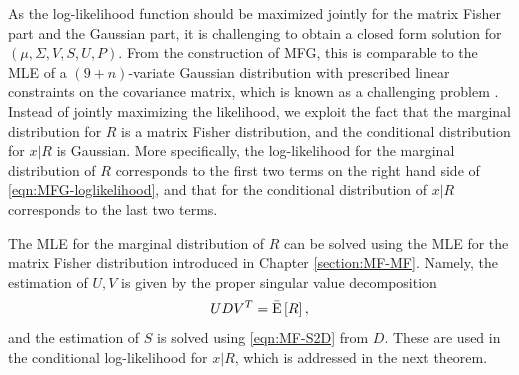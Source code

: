 As the log-likelihood function should be maximized jointly for the matrix Fisher part and the Gaussian part, it is challenging to obtain a closed form solution for $(\mu,\Sigma, V,S,U,P)$. 
From the construction of MFG, this is comparable to the MLE of a $(9+n)$-variate Gaussian distribution with prescribed linear constraints on the covariance matrix, which is known as a challenging problem \cite{zwiernik2017maximum}.
Instead of jointly maximizing the likelihood, we exploit the fact that the marginal distribution for $R$ is a matrix Fisher distribution, and the conditional distribution for $x|R$ is Gaussian. 
More specifically, the log-likelihood for the marginal distribution of $R$ corresponds to the first two terms on the right hand side of \eqref{eqn:MFG-loglikelihood}, and that for the conditional distribution of $x|R$ corresponds to the last two terms.

The MLE for the marginal distribution of $R$ can be solved using the MLE for the matrix Fisher distribution introduced in Chapter \ref{section:MF-MF}.
Namely, the estimation of $U,V$ is given by the proper singular value decomposition
\begin{align*}
	UDV^T = \bar{\mathrm{E}}\left[ R \right],
\end{align*}
and the estimation of $S$ is solved using \eqref{eqn:MF-S2D} from $D$.
These are used in the conditional log-likelihood for $x|R$, which is addressed in the next theorem.

